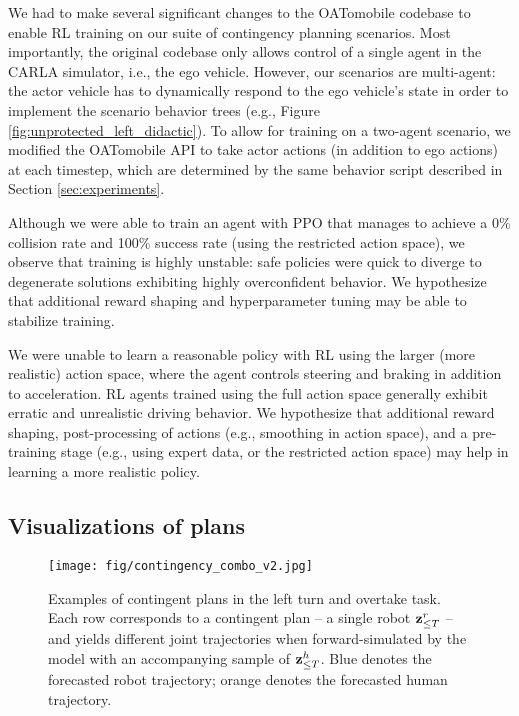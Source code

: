 We had to make several significant changes to the OATomobile codebase to enable RL training on our suite of contingency planning scenarios. Most importantly, the original codebase only allows control of a single agent in the CARLA simulator, i.e., the ego vehicle. However, our scenarios are multi-agent: the actor vehicle has to dynamically respond to the ego vehicle's state in order to implement the scenario behavior trees (e.g., Figure \ref{fig:unprotected_left_didactic}). To allow for training on a two-agent scenario, we modified the OATomobile API to take actor actions (in addition to ego actions) at each timestep, which are determined by the same behavior script described in Section \ref{sec:experiments}.

Although we were able to train an agent with PPO that manages to achieve a 0\% collision rate and 100\% success rate (using the restricted action space), we observe that training is highly unstable: safe policies were quick to diverge to degenerate solutions exhibiting highly overconfident behavior. We hypothesize that additional reward shaping and hyperparameter tuning may be able to stabilize training.

We were unable to learn a reasonable policy with RL using the larger (more realistic) action space, where the agent controls steering and braking in addition to acceleration. RL agents trained using the full action space generally exhibit erratic and unrealistic driving behavior. We hypothesize that additional reward shaping, post-processing of actions (e.g., smoothing in action space), and a pre-training stage (e.g., using expert data, or the restricted action space) may help in learning a more realistic policy.

\subsection{Visualizations of plans}

\begin{figure}[thb]
    \centering
    \texttt{[image: fig/contingency\_combo\_v2.jpg]}
    \caption{\small Examples of contingent plans in the left turn and overtake task. Each row corresponds to a contingent plan -- a single robot $\mathbf{z}_{\leq T}^r$ -- and yields different joint trajectories when forward-simulated by the model with an accompanying sample of $\mathbf{z}_{\leq T}^h$. Blue denotes the forecasted robot trajectory; orange denotes the forecasted human trajectory.}
    \label{fig:contingent_plan_examples}
    \vspace{-10pt}
\end{figure}

